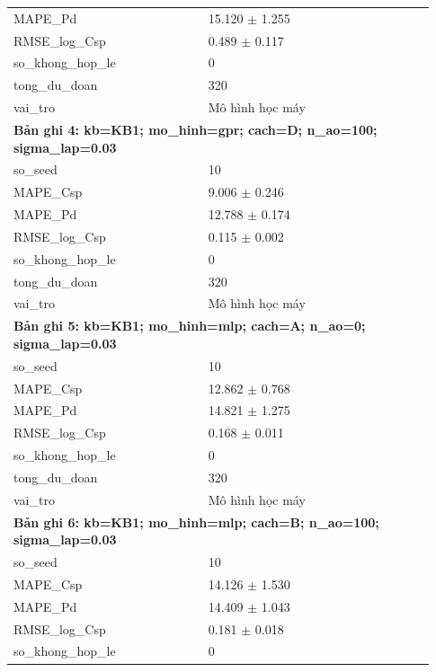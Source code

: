 \begin{longtable}{p{0.43\linewidth}p{0.50\linewidth}}
MAPE\_\allowbreak Pd & 15.120 $\pm$ 1.255 \\
RMSE\_\allowbreak log\_\allowbreak Csp & 0.489 $\pm$ 0.117 \\
so\_\allowbreak khong\_\allowbreak hop\_\allowbreak le & 0 \\
tong\_\allowbreak du\_\allowbreak doan & 320 \\
vai\_\allowbreak tro & Mô hình học máy \\
\midrule
\multicolumn{2}{p{0.95\linewidth}}{\textbf{Bản ghi 4: kb=KB1; mo\_hinh=gpr; cach=D; n\_ao=100; sigma\_lap=0.03}} \\
so\_\allowbreak seed & 10 \\
MAPE\_\allowbreak Csp & 9.006 $\pm$ 0.246 \\
MAPE\_\allowbreak Pd & 12.788 $\pm$ 0.174 \\
RMSE\_\allowbreak log\_\allowbreak Csp & 0.115 $\pm$ 0.002 \\
so\_\allowbreak khong\_\allowbreak hop\_\allowbreak le & 0 \\
tong\_\allowbreak du\_\allowbreak doan & 320 \\
vai\_\allowbreak tro & Mô hình học máy \\
\midrule
\multicolumn{2}{p{0.95\linewidth}}{\textbf{Bản ghi 5: kb=KB1; mo\_hinh=mlp; cach=A; n\_ao=0; sigma\_lap=0.03}} \\
so\_\allowbreak seed & 10 \\
MAPE\_\allowbreak Csp & 12.862 $\pm$ 0.768 \\
MAPE\_\allowbreak Pd & 14.821 $\pm$ 1.275 \\
RMSE\_\allowbreak log\_\allowbreak Csp & 0.168 $\pm$ 0.011 \\
so\_\allowbreak khong\_\allowbreak hop\_\allowbreak le & 0 \\
tong\_\allowbreak du\_\allowbreak doan & 320 \\
vai\_\allowbreak tro & Mô hình học máy \\
\midrule
\multicolumn{2}{p{0.95\linewidth}}{\textbf{Bản ghi 6: kb=KB1; mo\_hinh=mlp; cach=B; n\_ao=100; sigma\_lap=0.03}} \\
so\_\allowbreak seed & 10 \\
MAPE\_\allowbreak Csp & 14.126 $\pm$ 1.530 \\
MAPE\_\allowbreak Pd & 14.409 $\pm$ 1.043 \\
RMSE\_\allowbreak log\_\allowbreak Csp & 0.181 $\pm$ 0.018 \\
so\_\allowbreak khong\_\allowbreak hop\_\allowbreak le & 0 \\

\end{longtable}
